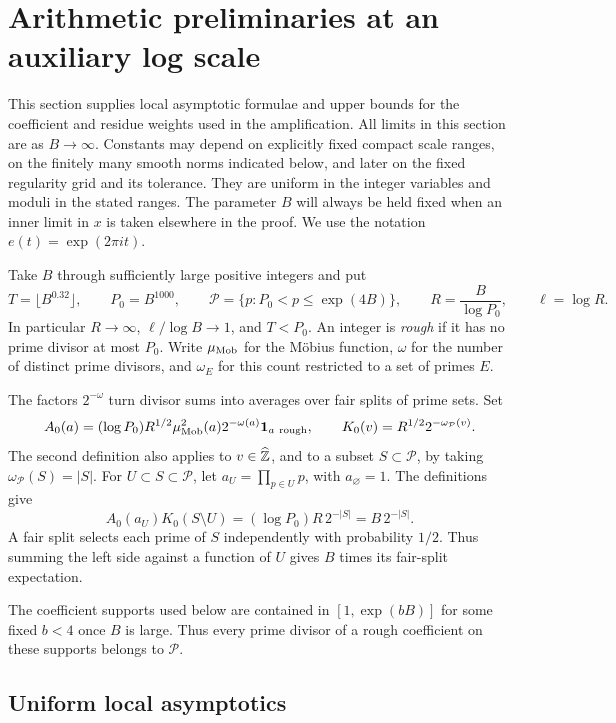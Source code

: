 \section{Arithmetic preliminaries at an auxiliary log scale}
\label{sec:arithmetic}

This section supplies local asymptotic formulae and upper bounds for the
coefficient and residue weights used in the amplification.  All limits in this
section are as $B\to\infty$.  Constants may depend on explicitly fixed compact
scale ranges, on the finitely many smooth norms indicated below, and later on
the fixed regularity grid and its tolerance.  They are uniform in the integer
variables and moduli in the stated ranges.  The parameter $B$ will always be
held fixed when an inner limit in $x$ is taken elsewhere in the proof.
We use the notation $e(t)=\exp(2\pi i t)$.

Take $B$ through sufficiently large positive integers and put
\[
 T=\lfloor B^{0.32}\rfloor,\qquad P_0=B^{1000},\qquad
 \mathcal P=\{p:P_0<p\le \exp(4B)\},\qquad
 R=\frac{B}{\log P_0},\qquad \ell=\log R.
\]
In particular $R\to\infty$, $\ell/\log B\to1$, and $T<P_0$.  An integer is
\emph{rough} if it has no prime divisor at most $P_0$.  Write
$\mu_{\rm Mob}$ for the M\"obius function, $\omega$ for the number of distinct
prime divisors, and $\omega_E$ for this count restricted to a set of primes $E$.

The factors $2^{-\omega}$ turn divisor sums into averages over fair splits
of prime sets.  Set
\[
 A_0(a)=(\log P_0)R^{1/2}\mu_{\rm Mob}^2(a)2^{-\omega(a)}
              \mathbf 1_{a\ {\rm rough}},\qquad
 K_0(v)=R^{1/2}2^{-\omega_{\mathcal P}(v)}.
\]
The second definition also applies to $v\in\widehat{\mathbb Z}$, and to a subset
$S\subset\mathcal P$, by taking $\omega_{\mathcal P}(S)=|S|$.
For $U\subset S\subset\mathcal P$, let $a_U=\prod_{p\in U}p$, with
$a_\varnothing=1$.  The definitions give
\begin{equation}\label{eq:arith-fair-split}
 A_0(a_U)K_0(S\setminus U)
 =(\log P_0)R\,2^{-|S|}
 =B\,2^{-|S|}.
\end{equation}
A fair split selects each prime of $S$ independently with probability
$1/2$.  Thus summing the left side against a function of $U$ gives $B$
times its fair-split expectation.

The coefficient supports used below are contained in $[1,\exp(bB)]$ for some
fixed $b<4$ once $B$ is large.  Thus every prime divisor of a rough coefficient
on these supports belongs to $\mathcal P$.

\subsection{Uniform local asymptotics}

